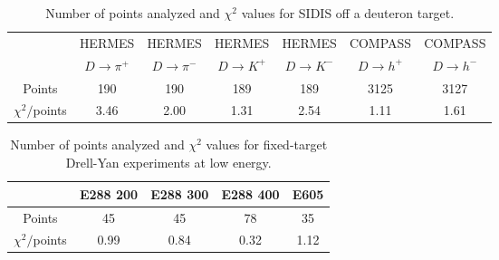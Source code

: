 \documentclass[aps,preprintnumbers,showpacs,nofootinbib,superscriptaddress,floatfix]{revtex4}
\begin{document}
\begin{table}[h!]
\begin{center}
\begin{tabular}{|c|c|c|c|c|c|c|}
 \hline
\hline
  & HERMES & HERMES & HERMES & HERMES & COMPASS & COMPASS\\
 ~          &  $D \to \pi^+$    &   $D \to \pi^-$    &  $D \to K^+$    &   $D \to K^-$      &  $D \to h^+$    &   $D \to h^-$            \\
\hline
 Points         &  190 & 190 & 189 & 189   & 3125 & 3127   \\
 \hline
$\chi^2 /$points &3.46 & 2.00 & 1.31 & 2.54  & 1.11 & 1.61 \\            
 \hline
 \hline
\end{tabular}
\caption{Number of points analyzed and $\chi^2$ values for SIDIS off a deuteron target.} 
\label{t:fl_ind_chi2_eD}
\end{center}
\end{table}

\begin{table}[h!]
\begin{center}
\renewcommand{\tabcolsep}{0.4pc} %
\renewcommand{\arraystretch}{1.2} %
\begin{tabular}{|c|c|c|c|c|}
 \hline
 \hline
 ~                        &  E288 200    &  E288 300        &  E288 400          &  E605                \\
 \hline
 Points                   &      45      &   45             &       78           &     35               \\
 \hline
$ \chi^2  /$points      &  0.99        &    0.84           &       0.32
&   1.12     \\
\hline
\hline
\end{tabular}
\caption{Number of points analyzed and $\chi^2$ values for fixed-target Drell-Yan experiments at low energy.}
\label{t:fl_ind_chi2_DY}
\end{center}
\end{table}
\end{document}
